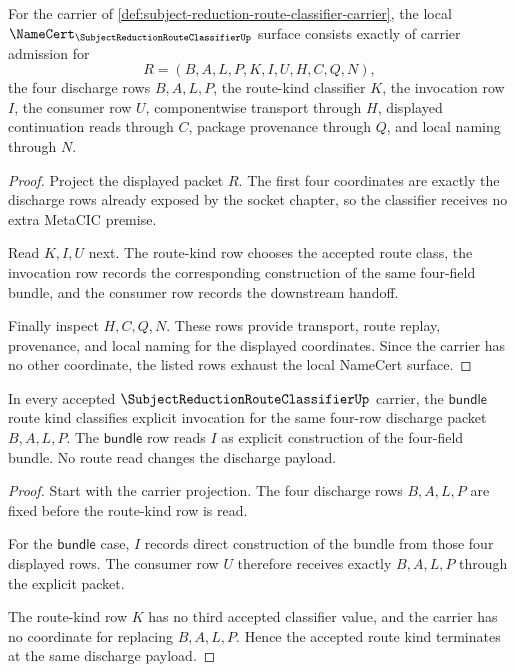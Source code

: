 \begin{theorem}
\label{thm:subject-reduction-route-classifier-namecert-obligations}
For the carrier of \autoref{def:subject-reduction-route-classifier-carrier}, the local $\NameCert_{\SubjectReductionRouteClassifierUp}$ surface consists exactly of carrier admission for
$$
R=(B,A,L,P,K,I,U,H,C,Q,N),
$$
the four discharge rows $B,A,L,P$, the route-kind classifier $K$, the invocation row $I$, the consumer row $U$, componentwise transport through $H$, displayed continuation reads through $C$, package provenance through $Q$, and local naming through $N$.
\end{theorem}
\begin{proof}
Project the displayed packet $R$. The first four coordinates are exactly the discharge rows already exposed by the socket chapter, so the classifier receives no extra MetaCIC premise.

Read $K,I,U$ next. The route-kind row chooses the accepted route class, the invocation row records the corresponding construction of the same four-field bundle, and the consumer row records the downstream handoff.

Finally inspect $H,C,Q,N$. These rows provide transport, route replay, provenance, and local naming for the displayed coordinates. Since the carrier has no other coordinate, the listed rows exhaust the local NameCert surface.
\end{proof}

\begin{theorem}
\label{thm:subject-reduction-route-classifier-canonical-bundle-correspondence}
In every accepted $\SubjectReductionRouteClassifierUp$ carrier, the $\mathsf{bundle}$ route kind classifies explicit invocation for the same four-row discharge packet $B,A,L,P$. The $\mathsf{bundle}$ row reads $I$ as explicit construction of the four-field bundle. No route read changes the discharge payload.
\end{theorem}
\begin{proof}
Start with the carrier projection. The four discharge rows $B,A,L,P$ are fixed before the route-kind row is read.

For the $\mathsf{bundle}$ case, $I$ records direct construction of the bundle from those four displayed rows. The consumer row $U$ therefore receives exactly $B,A,L,P$ through the explicit packet.

The route-kind row $K$ has no third accepted classifier value, and the carrier has no coordinate for replacing $B,A,L,P$. Hence the accepted route kind terminates at the same discharge payload.
\end{proof}

